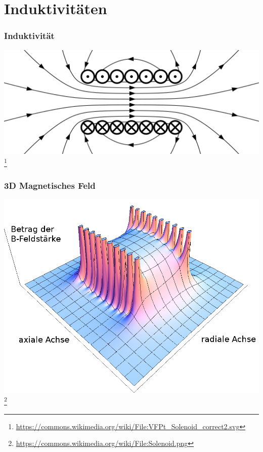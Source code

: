 \section*{Induktivitäten}
\begin{frame}
    \frametitle{Induktivität}
	
	\begin{center}
        \includegraphics[width=1\textwidth]{e06/H-Feld.png}
        \footnote{\tiny \url{https://commons.wikimedia.org/wiki/File:VFPt_Solenoid_correct2.svg}}
    \end{center}
    
\end{frame}

\begin{frame}
    \frametitle{3D Magnetisches Feld}
    \begin{center}
        \includegraphics[width=1\textwidth]{e06/3-D_HFeld.png}
        \footnote{\tiny \url{https://commons.wikimedia.org/wiki/File:Solenoid.png}}
    \end{center}

\end{frame}

